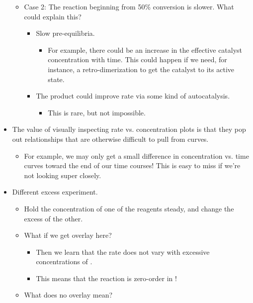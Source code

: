 \documentclass[../notes.tex]{subfiles}
\begin{document}
\begin{itemize}
\begin{itemize}
\begin{itemize}
        \end{itemize}
        \item Case 2: The reaction beginning from 50\% conversion is slower. What could explain this?
        \begin{itemize}
            \item Slow pre-equilibria.
            \begin{itemize}
                \item For example, there could be an increase in the effective catalyst concentration with time. This could happen if we need, for instance, a retro-dimerization to get the catalyst to its active state.
            \end{itemize}
            \item The product could improve rate via some kind of autocatalysis.
            \begin{itemize}
                \item This is rare, but not impossible.
            \end{itemize}
        \end{itemize}
    \end{itemize}
    \item The value of visually inspecting rate vs. concentration plots is that they pop out relationships that are otherwise difficult to pull from curves.
    \begin{itemize}
        \item For example, we may only get a small difference in concentration vs. time curves toward the end of our time courses! This is easy to miss if we're not looking super closely.
    \end{itemize}
    \item Different excess experiment.
    \begin{itemize}
        \item Hold the concentration of one of the reagents steady, and change the excess of the other.
        \item What if we get overlay here? 
        \begin{itemize}
            \item Then we learn that the rate does not vary with excessive concentrations of .
            \item This means that the reaction is zero-order in !
        \end{itemize}
        \pagebreak
        \item What does no overlay mean?

\end{itemize}
\end{itemize}
\end{document}
